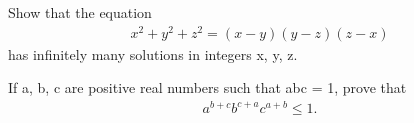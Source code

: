 \item Show that the equation
\begin{align*}
x^{2} + y^{2} + z^{2} = (x - y)(y - z)(z - x)
\end{align*}
has infinitely many solutions in integers x, y, z.

\item If a, b, c are positive real numbers such that abc = 1, prove that
\begin{align*}
a^{b+c} b^{c+a} c^{a+b} \leq 1.
\end{align*}


















